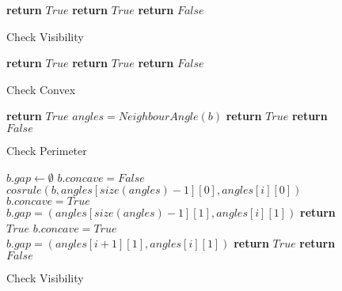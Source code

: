 \documentclass{ieeeaccess}
\begin{document}
\begin{figure}
\begin{algorithmic}[1]
{}
\State\textbf{return} $True$
   \EndIf
{}
\State\textbf{return} $True$
\EndIf
\EndFor
\State\textbf{return} $False$
\EndProcedure
\end{algorithmic}
\caption{Check Visibility}
\label{algo:CheckVisibility}
\end{figure}

\begin{figure}
\begin{algorithmic}[1]
{}
\State\textbf{return} $True$
\EndIf
\EndIf
{}
\State\textbf{return} $True$
\EndIf
\EndFor
\State\textbf{return} $False$
\EndProcedure
\end{algorithmic}
\caption{Check Convex}
\label{algo:CheckConvex}
\end{figure}

\begin{figure}
\begin{algorithmic}[1]
{}
\State\textbf{return} $True$
\EndIf
\State$angles = NeighbourAngle(b)$
\State\textbf{return} $True$
\EndIf
\EndIf
\State\textbf{return} $False$
\EndProcedure
\end{algorithmic}
\caption{Check Perimeter}
\label{algo:CheckPerimeter}
\end{figure}

\begin{figure}
\begin{algorithmic}[1]
\State $b.gap \gets \emptyset$
\State $b.concave = False$
\If
{$cosrule(b,angles[size(angles)-1][0], angles[i][0])$}
\State $b.concave = True$
\State $b.gap = (angles[size(angles)-1][1], angles[i][1])$
\EndIf
   \State\textbf{return} $True$
   \EndIf
\EndIf
{}
\State $b.concave = True$\;
\State $b.gap = (angles[i + 1][1],angles[i][1])$
  \EndIf
  \State\textbf{return} $True$
\EndIf
\EndFor
\State\textbf{return} $False$
\EndProcedure
\end{algorithmic}
\caption{Check Visibility}
\label{algo:checkVisibility2}
\end{figure}

\EOD
\end{document}
